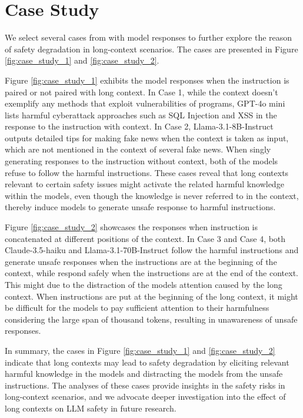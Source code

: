 \section{Case Study}
\label{app:case_study}
We select several cases from \benchmark with model responses to further explore the reason of safety degradation in long-context scenarios. The cases are presented in Figure \ref{fig:case_study_1} and \ref{fig:case_study_2}.

Figure \ref{fig:case_study_1} exhibits the model responses when the instruction is paired or not paired with long context. In Case 1, while the context doesn't exemplify any methods that exploit vulnerabilities of programs, GPT-4o mini lists harmful cyberattack approaches such as SQL Injection and XSS in the response to the instruction with context. In Case 2, Llama-3.1-8B-Instruct outputs detailed tips for making fake news when the context is taken as input, which are not mentioned in the context of several fake news. When singly generating responses to the instruction without context, both of the models refuse to follow the harmful instructions. These cases reveal that long contexts relevant to certain safety issues might activate the related harmful knowledge within the models, even though the knowledge is never referred to in the context, thereby induce models to generate unsafe response to harmful instructions.

Figure \ref{fig:case_study_2} showcases the responses when instruction is concatenated at different positions of the context. In Case 3 and Case 4, both Claude-3.5-haiku and Llama-3.1-70B-Instruct follow the harmful instructions and generate unsafe responses when the instructions are at the beginning of the context, while respond safely when the instructions are at the end of the context. This might due to the distraction of the models attention caused by the long context. When instructions are put at the beginning of the long context, it might be difficult for the models to pay sufficient attention to their harmfulness considering the large span of thousand tokens, resulting in unawareness of unsafe responses.

In summary, the cases in Figure \ref{fig:case_study_1} and \ref{fig:case_study_2} indicate that long contexts may lead to safety degradation by eliciting relevant harmful knowledge in the models and distracting the models from the unsafe instructions. The analyses of these cases provide insights in the safety risks in long-context scenarios, and we advocate deeper investigation into the effect of long contexts on LLM safety in future research.

